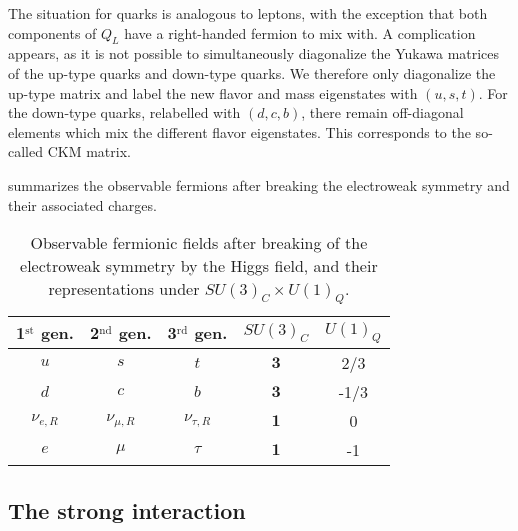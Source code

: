     The situation for quarks is analogous to leptons, with the exception that both components
    of $Q_L$ have a right-handed fermion to mix with. A complication appears, as
    it is not possible to simultaneously diagonalize the Yukawa matrices of the up-type
    quarks and down-type quarks. We therefore only diagonalize the up-type matrix and
    label the new flavor and mass eigenstates with $(u,s,t)$. For the down-type quarks,
    relabelled with $(d,c,b)$, there remain off-diagonal elements which mix the
    different flavor eigenstates. This corresponds to the so-called CKM matrix.

     summarizes the observable
    fermions after breaking the electroweak symmetry and their associated charges.

    \begin{table}[b]
        \centering
        \begin{tabular}{|ccc||cc|}
            \hline
            1$^\text{st}$ gen. & 2$^\text{nd}$ gen. & 3$^\text{rd}$ gen.  & $SU(3)_C$ & $U(1)_Q$  \\
            \hline
            \hline
            $u$                & $s$                & $t$                 & $\mathbf{3}$ &  2/3 \\
            $d$                & $c$                & $b$                 & $\mathbf{3}$ & -1/3 \\
            \hline
            \hline
            $\nu_{e,R}$        & $\nu_{\mu,R}$      & $\nu_{\tau,R}$      & $\mathbf{1}$ &  0   \\
            $e$                & $\mu$              & $\tau$              & $\mathbf{1}$ & -1   \\
            \hline
        \end{tabular}
        \caption{Observable fermionic fields after breaking of the electroweak symmetry
        by the Higgs field, and their representations under $SU(3)_C \times U(1)_Q$.}
        \label{tab:StandardModelFieldsAfterElectroweakBreaking}
    \end{table}

    \subsection{The strong interaction \label{sec:strongInteraction}}

